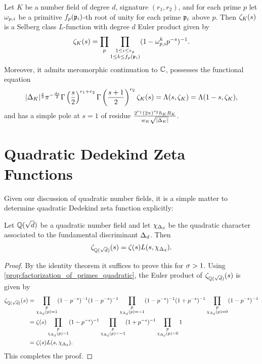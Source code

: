       \begin{theorem}\label{thm:Dedekind_Selberg}
        Let $K$ be a number field of degree $d$, signature $(r_{1},r_{2})$, and for each prime $p$ let $\omega_{p,i}$ be a primitive $f_{p}(\mathfrak{p}_{i})$-th root of unity for each prime $\mathfrak{p}_{i}$ above $p$. Then $\zeta_{K}(s)$ is a Selberg class $L$-function with degree $d$ Euler product given by
        \[
          \zeta_{K}(s) = \prod_{p}\prod_{\substack{1 \le i \le r_{p} \\ 1 \le k \le f_{p}(\mathfrak{p}_{i})}}(1-\omega_{p,i}^{k}p^{-s})^{-1}.
        \]
        Moreover, it admits meromorphic continuation to $\mathbb{C}$, possesses the functional equation
        \[
          |\Delta_{K}|^{\frac{s}{2}}\pi^{-\frac{ds}{2}}\Gamma\left(\frac{s}{2}\right)^{r_{1}+r_{2}}\Gamma\left(\frac{s+1}{2}\right)^{r_{2}}\zeta_{K}(s) = \Lambda(s,\zeta_{K}) = \Lambda(1-s,\zeta_{K}),
        \]
        and has a simple pole at $s = 1$ of residue $\frac{2^{r_{1}}(2\pi)^{r_{2}}h_{K}R_{K}}{w_{K}\sqrt{|\Delta_{K}|}}$.
      \end{theorem}
  \section{Quadratic Dedekind Zeta Functions}
    Given our discussion of quadratic number fields, it is a simple matter to determine quadratic Dedekind zeta function explicitly:

    \begin{theorem}\label{thm:factorization_of_Dedekind_of_quadratic}
      Let $\mathbb{Q}(\sqrt{d})$ be a quadratic number field and let $\chi_{\Delta_{d}}$ be the quadratic character associated to the fundamental discriminant $\Delta_{d}$. Then
      \[
        \zeta_{\mathbb{Q}(\sqrt{d})}(s) = \zeta(s)L(s,\chi_{\Delta_{d}}).
      \]
    \end{theorem}
    \begin{proof}
      By the identity theorem it suffices to prove this for $\sigma > 1$. Using \cref{prop:factorization_of_primes_quadratic}, the Euler product of $\zeta_{\mathbb{Q}(\sqrt{d})}(s)$ is given by
      \begin{align*}
        \zeta_{\mathbb{Q}(\sqrt{d})}(s) &= \prod_{\substack{p \\ \chi_{\Delta_{d}}(p) = 1}}(1-p^{-s})^{-1}(1-p^{-s})^{-1}\prod_{\substack{p \\ \chi_{\Delta_{d}}(p) = -1}}(1-p^{-s})^{-1}(1+p^{-s})^{-1}\prod_{\substack{p \\ \chi_{\Delta_{d}}(p) = 0}}(1-p^{-s})^{-1} \\
        &= \zeta(s)\prod_{\substack{p \\ \chi_{\Delta_{d}}(p) = 1}}(1-p^{-s})^{-1}\prod_{\substack{p \\ \chi_{\Delta_{d}}(p) = -1}}(1+p^{-s})^{-1}\prod_{\substack{p \\ \chi_{\Delta_{d}}(p) = 0}}1 \\
        &= \zeta(s)L(s,\chi_{\Delta_{d}}).
      \end{align*}
      This completes the proof.
    \end{proof}

